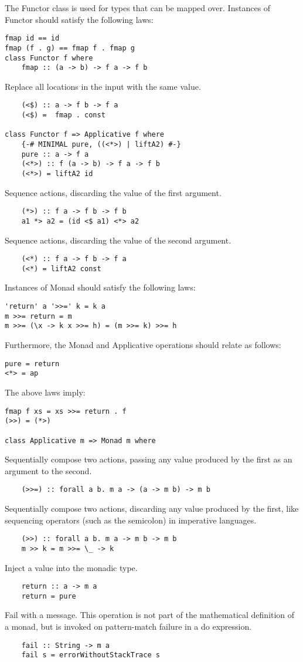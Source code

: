 \documentclass[fontsize=10pt]{slnotes}
\begin{document}
The Functor class is used for types that can be mapped over. Instances of Functor should satisfy the following laws:
\begin{lstlisting}
fmap id == id
fmap (f . g) == fmap f . fmap g
class Functor f where
    fmap :: (a -> b) -> f a -> f b
\end{lstlisting}
Replace all locations in the input with the same value.
\begin{lstlisting}
    (<$) :: a -> f b -> f a
    (<$) =  fmap . const

class Functor f => Applicative f where
    {-# MINIMAL pure, ((<*>) | liftA2) #-}
    pure :: a -> f a
    (<*>) :: f (a -> b) -> f a -> f b
    (<*>) = liftA2 id
\end{lstlisting}
Sequence actions, discarding the value of the first argument.
\begin{lstlisting}
    (*>) :: f a -> f b -> f b
    a1 *> a2 = (id <$ a1) <*> a2
\end{lstlisting}
Sequence actions, discarding the value of the second argument.
\begin{lstlisting}
    (<*) :: f a -> f b -> f a
    (<*) = liftA2 const
\end{lstlisting}

Instances of Monad should satisfy the following laws:
\begin{lstlisting}
'return' a '>>=' k = k a
m >>= return = m
m >>= (\x -> k x >>= h) = (m >>= k) >>= h
\end{lstlisting}

Furthermore, the Monad and Applicative operations should relate as follows:
\begin{lstlisting}
pure = return
<*> = ap
\end{lstlisting}

The above laws imply:
\begin{lstlisting}
fmap f xs = xs >>= return . f
(>>) = (*>)

class Applicative m => Monad m where
\end{lstlisting}
Sequentially compose two actions, passing any value produced by the first as an argument to the second.
\begin{lstlisting}
    (>>=) :: forall a b. m a -> (a -> m b) -> m b
\end{lstlisting}
Sequentially compose two actions, discarding any value produced
by the first, like sequencing operators (such as the semicolon)
in imperative languages.
\begin{lstlisting}
    (>>) :: forall a b. m a -> m b -> m b
    m >> k = m >>= \_ -> k
\end{lstlisting}
Inject a value into the monadic type.
\begin{lstlisting}
    return :: a -> m a
    return = pure
\end{lstlisting}
Fail with a message.  This operation is not part of the
mathematical definition of a monad, but is invoked on pattern-match
failure in a do expression.
\begin{lstlisting}
    fail :: String -> m a
    fail s = errorWithoutStackTrace s
\end{lstlisting}
\end{document}
